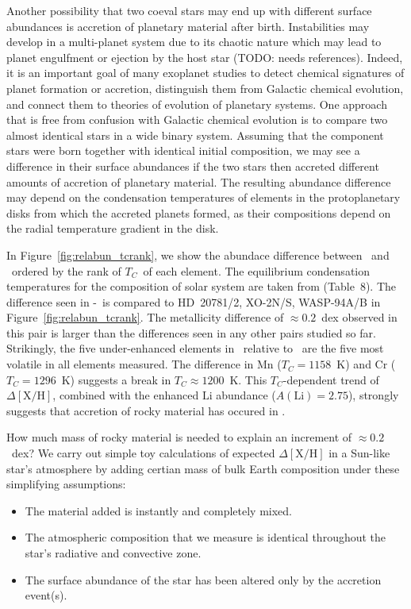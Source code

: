 \documentclass[modern, letterpaper]{aastex61}
\newcommand{\figname}{Figure}
\newcommand*\elem[1]{\ensuremath{\mathrm{#1}}}
\newcommand*\elemH[1]{\ensuremath{[\mathrm{#1}/\elem{H}]}}
\newcommand{\sunanalog}{\text{Krios}}
\newcommand{\bizarreone}{\text{Kronos}}
\newcommand{\Tcondens}{\ensuremath{T_C}}
\newcommand{\todo}[1]{{\color{blue}TODO: #1}}
\begin{document}
Another possibility that two coeval stars may end up with different surface
abundances is accretion of planetary material after birth.
Instabilities may develop in a multi-planet system due to its chaotic nature
which may lead to planet engulfment or ejection by the host star
(\todo{needs references}).
Indeed, it is an important goal of many exoplanet studies
to detect chemical signatures of planet formation or accretion,
distinguish them from Galactic chemical evolution, and
connect them to theories of evolution of planetary systems.
One approach that is free from confusion with Galactic chemical evolution
is to compare two almost identical stars in a wide binary system.
Assuming that the component stars were born together with identical
initial composition, we may see a difference in their surface abundances
if the two stars then accreted different amounts of accretion
of planetary material.
The resulting abundance difference may depend on the condensation
temperatures of elements in the protoplanetary disks from which the accreted
planets formed, as their compositions depend on the radial temperature gradient
in the disk.

In Figure~\ref{fig:relabun_tcrank}, we show the abundace difference
between \bizarreone\ and \sunanalog\ ordered by the rank of \Tcondens\
of each element.
The equilibrium condensation temperatures for the composition of solar system
are taken from \citealt{2003ApJ...591.1220L} (Table~8).
The difference seen in \bizarreone-\sunanalog\ is
compared to HD~20781/2, XO-2N/S, WASP-94A/B in \figname~\ref{fig:relabun_tcrank}.
The metallicity difference of $\approx 0.2$~dex observed in this pair
is larger than the differences seen in any other pairs studied so far.
Strikingly, the five under-enhanced elements in \bizarreone\
relative to \sunanalog\ are the five most volatile in all elements measured.
The difference in \elem{Mn} ($\Tcondens = 1158$~K) and
\elem{Cr} ($\Tcondens = 1296$~K) suggests a break in $\Tcondens \approx 1200$~K.
This $\Tcondens$-dependent trend of $\Delta\elemH{X}$,
combined with the enhanced $\elem{Li}$ abundance ($A(\elem{Li}) = 2.75$),
strongly suggests that accretion of rocky material has occured in \bizarreone.

How much mass of rocky material is needed to explain an increment of
$\approx 0.2$~dex?
We carry out simple toy calculations of expected $\Delta\elemH{X}$
in a Sun-like star's atmosphere by adding certian mass of bulk Earth composition
under these simplifying assumptions:
\begin{itemize}
  \item The material added is instantly and completely mixed.
  \item The atmospheric composition that we measure is identical throughout
    the star's radiative and convective zone.
  \item The surface abundance of the star has been altered only by the
    accretion event(s).
\end{itemize}
\end{document}
